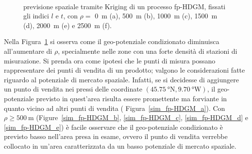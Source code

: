 \begin{figure}[htbp]
	\
	\caption[Previsione spaziale tramite Kriging di un processo fp-HDGM al variare di $\rho$]{previsione spaziale tramite Kriging di un processo fp-HDGM, fissati gli indici $l$ e $t$, con $\rho=$ \SI{0}{\meter} (a), \SI{500}{\meter} (b), \SI{1000}{\meter} (c), \SI{1500}{\meter} (d), \SI{2000}{\meter} (e) e \SI{2500}{\meter} (f).}
	\label{sim_fp-HDGM}
\end{figure}
Nella Figura~\ref{sim_fp-HDGM} si osserva come il geo-potenziale condizionato diminuisca all'aumentare di $\rho$, specialmente nelle zone con una forte densità di stazioni di misurazione. Si prenda ora come ipotesi che le punti di misura possano rappresentare dei punti di vendita di un prodotto; valgono le considerazioni fatte riguardo al potenziale di mercato spaziale. Infatti, se si decidesse di aggiungere un punto di vendita nei pressi delle coordinate $(\SI{45.75}{\degree} \text{N}, \SI{9.70}{\degree} \text{W})$, il geo-potenziale previsto in quest'area risulta essere promettente ma forviante in quanto vicino ad altri punti di vendita ( Figura~\ref{sim_fp-HDGM_a}). Con $\rho \geq \SI{500}{\meter}$ (Figure~\ref{sim_fp-HDGM_b}, \ref{sim_fp-HDGM_c},  \ref{sim_fp-HDGM_d} e \ref{sim_fp-HDGM_e}) è facile osservare che il geo-potenziale condizionato è previsto basso nell'area presa in esame, ovvero il punto di vendita verrebbe collocato in un'area caratterizzata da un basso potenziale di mercato spaziale.